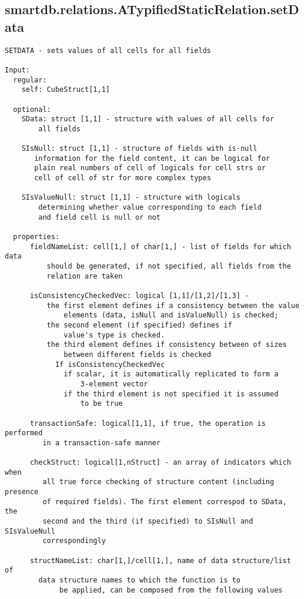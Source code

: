 \subsection{\texorpdfstring{smartdb.relations.ATypifiedStaticRelation.setData}{setData}}\label{method:smartdb.relations.ATypifiedStaticRelation.setData}
\begin{verbatim}
SETDATA - sets values of all cells for all fields

Input:
  regular:
    self: CubeStruct[1,1]

  optional:
    SData: struct [1,1] - structure with values of all cells for
        all fields

    SIsNull: struct [1,1] - structure of fields with is-null
       information for the field content, it can be logical for
       plain real numbers of cell of logicals for cell strs or
       cell of cell of str for more complex types

    SIsValueNull: struct [1,1] - structure with logicals
        determining whether value corresponding to each field
        and field cell is null or not

  properties:
      fieldNameList: cell[1,] of char[1,] - list of fields for which data
          should be generated, if not specified, all fields from the
          relation are taken

      isConsistencyCheckedVec: logical [1,1]/[1,2]/[1,3] -
          the first element defines if a consistency between the value
              elements (data, isNull and isValueNull) is checked;
          the second element (if specified) defines if
              value's type is checked.
          the third element defines if consistency between of sizes
              between different fields is checked
            If isConsistencyCheckedVec
              if scalar, it is automatically replicated to form a
                  3-element vector
              if the third element is not specified it is assumed
                  to be true

      transactionSafe: logical[1,1], if true, the operation is performed
         in a transaction-safe manner

      checkStruct: logical[1,nStruct] - an array of indicators which when
         all true force checking of structure content (including presence
         of required fields). The first element correspod to SData, the
         second and the third (if specified) to SIsNull and SIsValueNull
         correspondingly

      structNameList: char[1,]/cell[1,], name of data structure/list of
        data structure names to which the function is to
             be applied, can be composed from the following values


\end{verbatim}
